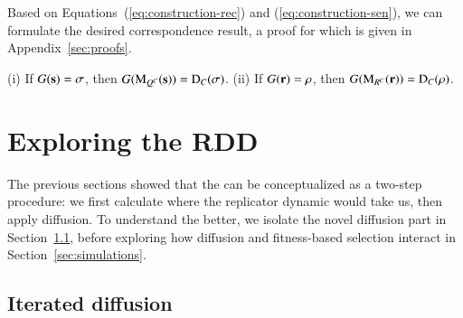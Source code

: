 \documentclass[fleqn,reqno,10pt]{article}
\renewcommand{\Smixed}{\ensuremath{\mathrm{\mathbf{s}}}}
\renewcommand{\Rmixed}{\ensuremath{\mathrm{\mathbf{r}}}}
\newcommand{\rdd}{\acro{rdd}} %
\newcommand{\Diff}{\ensuremath{\mathrm{D}}} %
\newcommand{\Mutate}{\ensuremath{\mathrm{M}}} %
\begin{document}
Based on Equations~(\ref{eq:construction-rec}) and
(\ref{eq:construction-sen}), we can formulate the desired
correspondence result, a proof for which is given in Appendix~\ref{sec:proofs}.

\begin{theorem}
  \label{thm:Correspondence}
  (i) If $G(\Smixed) = \Sstrat$, then $G(\Mutate_{Q^C}(\Smixed)) =
  \Diff_C(\Sstrat)$. (ii) If $G(\Rmixed) = \Rstrat$, then
  $G(\Mutate_{R^C}(\Rmixed)) = \Diff_C(\Rstrat)$.
\end{theorem}



\section{Exploring the RDD}
\label{sec:exploring-rdd}

The previous sections showed that the \rdd can be conceptualized as a
two-step procedure: we first calculate where the replicator dynamic
would take us, then apply diffusion. To understand the \rdd better, we
isolate the novel diffusion part in
Section~\ref{sec:iterated-diffusion}, before exploring how diffusion
and fitness-based selection interact in Section~\ref{sec:simulations}.

\subsection{Iterated diffusion}
\label{sec:iterated-diffusion}
\end{document}
